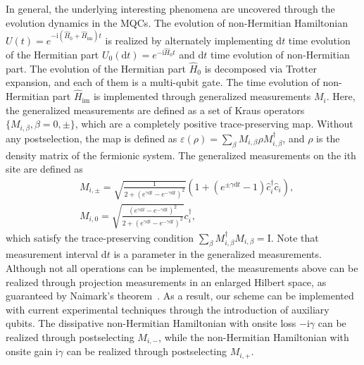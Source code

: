\documentclass[longbibliography, aps, prx, amsmath, amssymb, amsfonts, twocolumn,superscriptaddress, footinbib]{revtex4-1}
\begin{document}
	In general, the underlying interesting phenomena are uncovered through the evolution dynamics in the MQCs. The evolution of non-Hermitian Hamiltonian $U(t) = e^{-\mathrm{i}(\hat{H}_0 + \hat{H}_{\text{im}})t}$ is realized by alternately implementing $\mathrm{d} t$ time evolution of the Hermitian part $U_0(\mathrm{d}t)=e^{-\mathrm{i}\hat{H}_0 t}$ and $\mathrm{d} t$ time evolution of non-Hermitian part. 
	The evolution of the Hermitian part $\hat{H}_0$ is decomposed via Trotter expansion, and each of them is a multi-qubit gate. 
	The time evolution of non-Hermitian part $\hat{H}_{\text{im}}$ is implemented through generalized measurements $M_i$.
	Here, the generalized measurements are defined as a set of Kraus operators $\{M_{i,\beta},\beta=0,\pm \}$, which are a completely positive trace-preserving map. Without any postselection, the map is defined as
	$\varepsilon(\rho) = \sum_{\beta} M_{i, \beta} \rho M_{i, \beta}^{\dagger}$, and $\rho$ is the density matrix of the fermionic system.
	The generalized measurements on the ith site are defined as
	\begin{align}
		&M_{i,\pm} = \sqrt{\frac{1}{2+(e^{\gamma \mathrm{d} t} - e^{-\gamma \mathrm{d} t})^2}} (1 + (e^{\pm \gamma \mathrm{d} t}-1) \hat{c}_i^{\dagger} \hat{c}_i),\\
		&M_{i,0} = \sqrt{\frac{(e^{\gamma \mathrm{d} t} - e^{-\gamma \mathrm{d} t})^2}{2+(e^{\gamma \mathrm{d} t} - e^{-\gamma \mathrm{d} t})^2}} c_i^{\dagger},
	\end{align}
	which satisfy the trace-preserving condition $\sum_{\beta} M_{i,\beta}^{\dagger} M_{i,\beta}=\mathrm{I}$. 
	Note that measurement interval $\mathrm{d}t$ is a parameter in the generalized measurements. 
	Although not all operations can be implemented, the measurements above can be realized through projection measurements in an enlarged Hilbert space, as guaranteed by Naimark's theorem~\cite{coecke2008povms,nielsen2001quantum}. As a result, our scheme can be implemented with current experimental techniques through the introduction of auxiliary qubits.
	The dissipative non-Hermitian Hamiltonian with onsite loss $-\mathrm{i}\gamma$ can be realized through postselecting $M_{i,-}$, while the non-Hermitian Hamiltonian with onsite gain $\mathrm{i}\gamma$ can be realized through postselecting $M_{i,+}$. 
	
\end{document}
